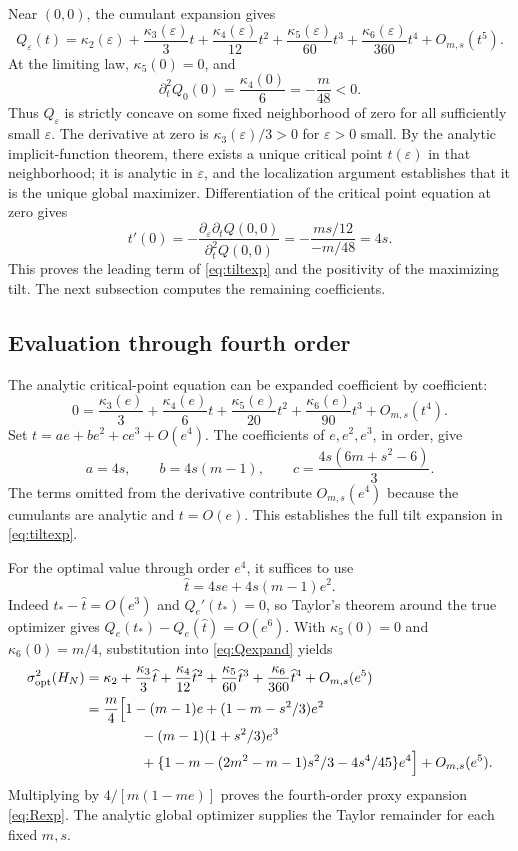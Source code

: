 \documentclass[11pt,a4paper]{article}
\begin{document}
Near $(0,0)$, the cumulant expansion gives
\begin{equation}\label{eq:Qexpand}
 Q_\varepsilon(t)=\kappa_2(\varepsilon)
 +\frac{\kappa_3(\varepsilon)}3t
 +\frac{\kappa_4(\varepsilon)}{12}t^2
 +\frac{\kappa_5(\varepsilon)}{60}t^3
 +\frac{\kappa_6(\varepsilon)}{360}t^4+O_{m,s}(t^5).
\end{equation}
At the limiting law, $\kappa_5(0)=0$, and
\[
 \partial_t^2Q_0(0)=\frac{\kappa_4(0)}6=-\frac m{48}<0.
\]
Thus $Q_\varepsilon$ is strictly concave on some fixed neighborhood of zero for all sufficiently small $\varepsilon$. The derivative at zero is $\kappa_3(\varepsilon)/3>0$ for $\varepsilon>0$ small. By the analytic implicit-function theorem, there exists a unique critical point $t(\varepsilon)$ in that neighborhood; it is analytic in $\varepsilon$, and the localization argument establishes that it is the unique global maximizer. Differentiation of the critical point equation at zero gives
\[
 t'(0)=-\frac{\partial_\varepsilon\partial_t Q(0,0)}{\partial_t^2Q(0,0)}
 =-\frac{ms/12}{-m/48}=4s.
\]
This proves the leading term of \eqref{eq:tiltexp} and the positivity of the maximizing tilt. The next subsection computes the remaining coefficients.

\subsection{Evaluation through fourth order}
The analytic critical-point equation can be expanded coefficient by coefficient:
\[
 0=\frac{\kappa_3(e)}3+\frac{\kappa_4(e)}6t
 +\frac{\kappa_5(e)}{20}t^2+\frac{\kappa_6(e)}{90}t^3+O_{m,s}(t^4).
\]
Set $t=a e+b e^2+c e^3+O(e^4)$. The coefficients of $e,e^2,e^3$, in order, give
\[
 a=4s,\qquad b=4s(m-1),\qquad c=\frac{4s(6m+s^2-6)}3.
\]
The terms omitted from the derivative contribute $O_{m,s}(e^4)$ because the cumulants are analytic and $t=O(e)$. This establishes the full tilt expansion in \eqref{eq:tiltexp}.

For the optimal value through order $e^4$, it suffices to use
\[
 \widehat t=4se+4s(m-1)e^2.
\]
Indeed $t_* -\widehat t=O(e^3)$ and $Q_e'(t_*)=0$, so Taylor's theorem around the true optimizer gives $Q_e(t_*)-Q_e(\widehat t)=O(e^6)$. With $\kappa_5(0)=0$ and $\kappa_6(0)=m/4$, substitution into \eqref{eq:Qexpand} yields
\begin{align*}
 \sigma^2_{\mathrm{opt}}(H_N)
 &=\kappa_2+\frac{\kappa_3}3\widehat t
 +\frac{\kappa_4}{12}\widehat t^2
 +\frac{\kappa_5}{60}\widehat t^3
 +\frac{\kappa_6}{360}\widehat t^4+O_{m,s}(e^5)\\
 &=\frac m4\Bigl[1-(m-1)e+(1-m-s^2/3)e^2\\
 &\hspace{14mm}-(m-1)(1+s^2/3)e^3\\
 &\hspace{14mm}+\{1-m-(2m^2-m-1)s^2/3-4s^4/45\}e^4\Bigr]
 +O_{m,s}(e^5).
\end{align*}
Multiplying by $4/[m(1-me)]$ proves the fourth-order proxy expansion \eqref{eq:Rexp}. The analytic global optimizer supplies the Taylor remainder for each fixed $m,s$.
\end{document}
